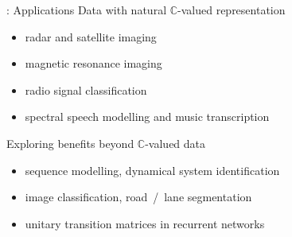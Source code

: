 \documentclass{beamer}
\newcommand{\cplx}{\mathbb{C}}
\begin{document}
\begin{frame}[c]{\insertsection: Applications}
  Data with natural $\cplx$-valued representation
  \begin{itemize}
    \item radar and satellite imaging
      {\tiny \\ \quad
        \citep{hirose_complex-valued_2009,hansch_complex-valued_2010,zhang_complex-valued_2017}}

    \smallskip
    \item magnetic resonance imaging
      {\tiny \\ \quad
        \citep{hui_mri_1995,wang_deepcomplexmri_2020}}

    \smallskip
    \item radio signal classification
      {\tiny \\ \quad
        \citep{yang_complex_2019,tarver_design_2019}}

    \smallskip
    \item spectral speech modelling and music transcription
      {\tiny \\ \quad
        \citep{wisdom_full-capacity_2016,trabelsi_deep_2018,yang_complex_2019}}
  \end{itemize}

  \pause
  \medskip
  Exploring benefits beyond $\cplx$-valued data
  \begin{itemize}
    \item sequence modelling, dynamical system identification
      {\tiny \\ \quad
        \citep{danihelka_associative_2016,wisdom_full-capacity_2016}}

    \smallskip
    \item image classification, road~/~lane segmentation  %
      {\tiny \\ \quad
        \citep{popa_complex-valued_2017,trabelsi_deep_2018,gaudet_deep_2018}}

    \smallskip
    \item unitary transition matrices in recurrent networks
      {\tiny \\ \quad
        \citep{arjovsky_unitary_2016,wisdom_full-capacity_2016}}
  \end{itemize}

\end{frame}
\end{document}

